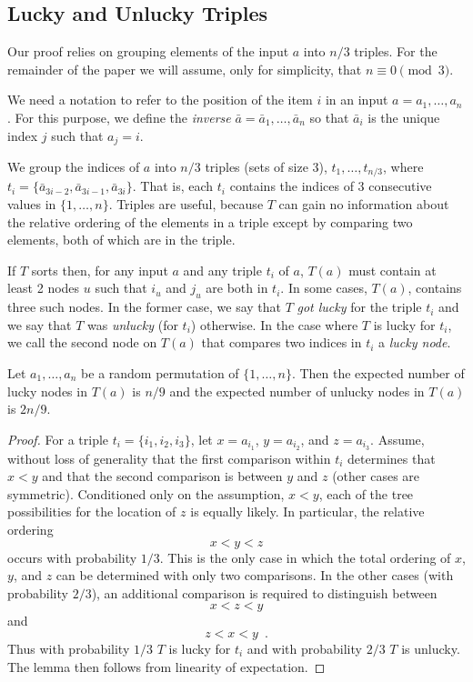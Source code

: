 \documentclass{patmorin}
\begin{document}
\subsection{Lucky and Unlucky Triples}

Our proof relies on grouping elements of the input $a$ into $n/3$ triples.
For the remainder of the paper we will assume, only for simplicity,
that $n\equiv 0\pmod{3}$. 

We need a notation to refer to the position of the item $i$ in an input
$a=a_1,\ldots,a_n$.  For this purpose, we define the \emph{inverse}
$\bar{a}=\bar{a}_1,\ldots,\bar{a}_n$ so that $\bar{a}_i$ is the unique
index $j$ such that $a_j=i$.

We group the indices of $a$ into $n/3$ triples
(sets of size 3), $t_1,\ldots,t_{n/3}$, where
$t_i=\{\bar{a}_{3i-2},\bar{a}_{3i-1},\bar{a}_{3i}\}$.  That is, each
$t_i$ contains the indices of 3 consecutive values in $\{1,\ldots,n\}$.
Triples are useful, because $T$ can gain no information about the relative
ordering of the elements in a triple except by comparing two elements,
both of which are in the triple.

If $T$ sorts then, for any input $a$ and any triple $t_i$ of $a$,
$T(a)$ must contain at least 2 nodes $u$ such that $i_u$ and $j_u$
are both in $t_i$.  In some cases, $T(a)$, contains three such nodes.
In the former case, we say that $T$ \emph{got lucky} for the triple $t_i$
and we say that $T$ was \emph{unlucky} (for $t_i$) otherwise.  In the
case where $T$ is lucky for $t_i$, we call the second node on $T(a)$
that compares two indices in $t_i$ a \emph{lucky node}.

\begin{lem}
  Let $a_1,\ldots,a_n$ be a random permutation of $\{1,\ldots,n\}$.
  Then the expected number of lucky nodes in $T(a)$ is $n/9$ and the
  expected number of unlucky nodes in $T(a)$ is $2n/9$.
\end{lem}

\begin{proof}
For a triple $t_i=\{i_1,i_2,i_3\}$, let $x=a_{i_1}$, $y=a_{i_2}$, and
$z=a_{i_3}$.  Assume, without loss of generality that the first comparison
within $t_i$ determines that $x<y$ and that the second comparison is
between $y$ and $z$ (other cases are symmetric).  Conditioned only on
the assumption, $x<y$, each of the tree possibilities for the location
of $z$ is equally likely.  In particular, the relative ordering
\[
   x < y < z
\]
occurs with probability $1/3$.  This is the only case in which the total ordering of $x$, $y$, and $z$ can be determined with only two comparisons.  In the other cases (with probability $2/3$), an additional comparison is required to distinguish between 
\[
   x < z < y
\]
and 
\[
   z < x < y \enspace .
\]
Thus with probability $1/3$ $T$ is lucky for $t_i$ and with probability
$2/3$ $T$ is unlucky.  The lemma then follows from linearity of
expectation.
\end{proof}
\end{document}
